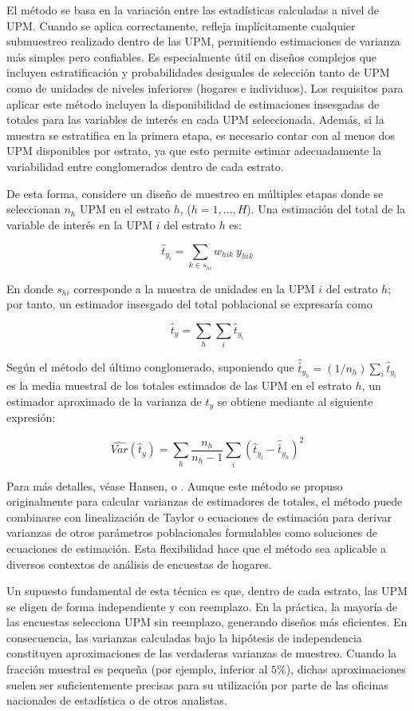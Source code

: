 \documentclass[
  spanish,
  12pt,
]{book}
\begin{document}
El método se basa en la variación entre las estadísticas calculadas a nivel de UPM. Cuando se aplica correctamente, refleja implícitamente cualquier submuestreo realizado dentro de las UPM, permitiendo estimaciones de varianza más simples pero confiables. Es especialmente útil en diseños complejos que incluyen estratificación y probabilidades desiguales de selección tanto de UPM como de unidades de niveles inferiores (hogares e individuos). Los requisitos para aplicar este método incluyen la disponibilidad de estimaciones insesgadas de totales para las variables de interés en cada UPM seleccionada. Además, si la muestra se estratifica en la primera etapa, es necesario contar con al menos dos UPM disponibles por estrato, ya que esto permite estimar adecuadamente la variabilidad entre conglomerados dentro de cada estrato.

De esta forma, considere un diseño de muestreo en múltiples etapas donde se seleccionan \(n_h\) UPM en el estrato \(h\), (\(h=1,\dots,H\)). Una estimación del total de la variable de interés en la UPM \(i\) del estrato \(h\) es:

\[
\hat{t}_{y_i} = \sum_{k\in s_{hi}} w_{hik} \ y_{hik}
\]

En donde \(s_{hi}\) corresponde a la muestra de unidades en la UPM \(i\) del estrato \(h\); por tanto, un estimador insesgado del total poblacional se expresaría como

\[
\hat{t}_{y}  = \sum_{h}\sum_{i} \hat{t}_{y_i}
\]

Según el método del último conglomerado, suponiendo que \(\hat{\bar t}_{y_h}=(1/{n_h}) \sum_{i} \hat{t}_{y_i}\) es la media muestral de los totales estimados de las UPM en el estrato \(h\), un estimador aproximado de la varianza de \(\hat t_y\) se obtiene mediante al siguiente expresión:

\[
\widehat{Var}(\hat{t}_y) = \sum_{h} \frac{n_h}{n_h-1} \sum_{i} (\hat{t}_{y_i} - \hat{\bar t}_{y_h})^2
\]

Para más detalles, véase Hansen, \citet[p.~258]{hansen1953sample} o \citet{wolter2007}. Aunque este método se propuso originalmente para calcular varianzas de estimadores de totales, el método puede combinarse con linealización de Taylor o ecuaciones de estimación para derivar varianzas de otros parámetros poblacionales formulables como soluciones de ecuaciones de estimación. Esta flexibilidad hace que el método sea aplicable a diversos contextos de análisis de encuestas de hogares.

Un supuesto fundamental de esta técnica es que, dentro de cada estrato, las UPM se eligen de forma independiente y con reemplazo. En la práctica, la mayoría de las encuestas selecciona UPM sin reemplazo, generando diseños más eficientes. En consecuencia, las varianzas calculadas bajo la hipótesis de independencia constituyen aproximaciones de las verdaderas varianzas de muestreo. Cuando la fracción muestral es pequeña (por ejemplo, inferior al \(5\%\)), dichas aproximaciones suelen ser suficientemente precisas para su utilización por parte de las oficinas nacionales de estadística o de otros analistas.
\end{document}
